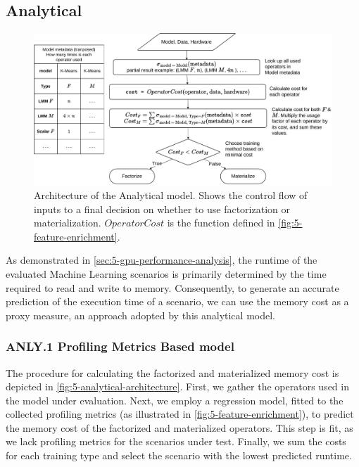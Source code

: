 \subsection{Analytical}
\label{subsec:5-analytical}
\begin{figure}[ht]
  \centering
  \includegraphics[width=\linewidth]{chapters/05_cost_estimation/figures/analytical-architecture.pdf}
  \caption[Analytical model Architecture]{Architecture of the Analytical model. Shows the control flow of inputs to a final decision on whether to use factorization or materialization. $OperatorCost$ is the function defined in \autoref{fig:5-feature-enrichment}.}
  \label{fig:5-analytical-architecture}
\end{figure}

As demonstrated in \autoref{sec:5-gpu-performance-analysis}, the runtime of the evaluated Machine Learning scenarios is primarily determined by the time required to read and write to memory. Consequently, to generate an accurate prediction of the execution time of a scenario, we can use the memory cost as a proxy measure, an approach adopted by this analytical model.

\subsubsection*{ANLY.1 Profiling Metrics Based model}
The procedure for calculating the factorized and materialized memory cost is depicted in \autoref{fig:5-analytical-architecture}. First, we gather the operators used in the model under evaluation. Next, we employ a regression model, fitted to the collected profiling metrics (as illustrated in \autoref{fig:5-feature-enrichment}), to predict the memory cost of the factorized and materialized operators. This step is fit, as we lack profiling metrics for the scenarios under test. Finally, we sum the costs for each training type and select the scenario with the lowest predicted runtime.

